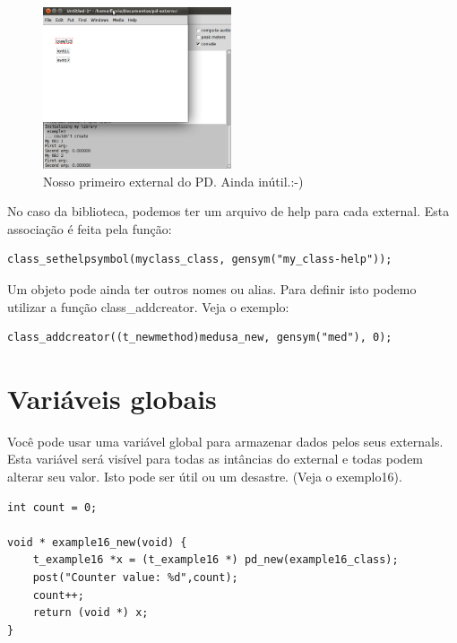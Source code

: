 \documentclass[10pt,a4paper]{report}
\begin{document}
\begin{figure}[h!]
	\centering
	\includegraphics[height=180]{./images/example3}
	\caption{Nosso primeiro external do PD. Ainda inútil.:-)}
\end{figure}


No caso da biblioteca, podemos ter um arquivo de help para cada external. Esta associação é feita pela função:
\begin{lstlisting}
class_sethelpsymbol(myclass_class, gensym("my_class-help"));
\end{lstlisting}

Um objeto pode ainda ter outros nomes ou alias. Para definir isto podemo utilizar a função class\_addcreator. Veja o exemplo:

\begin{lstlisting}
class_addcreator((t_newmethod)medusa_new, gensym("med"), 0);
\end{lstlisting}

\section{Variáveis globais}
Você pode usar uma variável global para armazenar dados pelos seus externals. Esta variável será visível para todas as intâncias do external e todas podem alterar seu valor. Isto pode ser útil ou um desastre. (Veja o exemplo16).

\begin{lstlisting}
int count = 0;

void * example16_new(void) {
    t_example16 *x = (t_example16 *) pd_new(example16_class);
    post("Counter value: %d",count);
    count++;
    return (void *) x;
}
\end{lstlisting}
\end{document}
